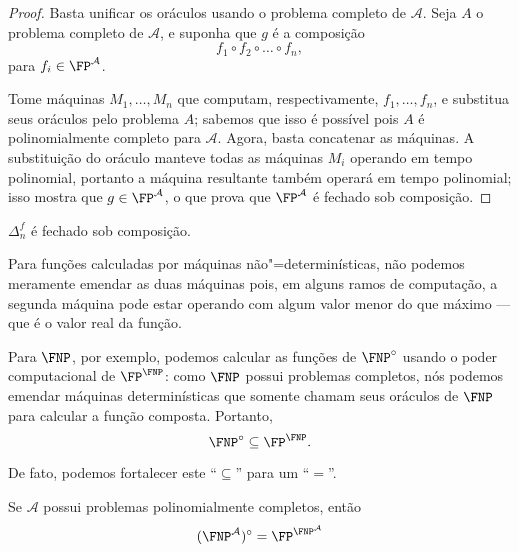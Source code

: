 \begin{proof}
    Basta unificar os oráculos usando o problema completo de $\mathcal A$.
    Seja $A$ o problema completo de $\mathcal A$,
    e suponha que $g$ é a composição
    \begin{equation*}
        f_1 \circ f_2 \circ \dots \circ f_n,
    \end{equation*}
    para $f_i \in \FP^\mathcal A$.

    Tome máquinas $M_1, \dots, M_n$ que computam,
    respectivamente, $f_1, \dots, f_n$,
    e substitua seus oráculos pelo problema $A$;
    sabemos que isso é possível pois $A$ é polinomialmente completo para $\mathcal A$.
    Agora,
    basta concatenar as máquinas.
    A substituição do oráculo manteve todas as máquinas $M_i$
    operando em tempo polinomial,
    portanto a máquina resultante também operará em tempo polinomial;
    isso mostra que $g \in \FP^\mathcal A$,
    o que prova que $\FP^\mathcal A$ é fechado sob composição.
\end{proof}

\begin{ucorollary}
    $\Delta_n^f$ é fechado sob composição.
\end{ucorollary}

Para funções calculadas por máquinas não"=determinísticas,
não podemos meramente emendar as duas máquinas
pois,
em alguns ramos de computação,
a segunda máquina pode estar operando com algum valor menor do que máximo
--- que é o valor real da função.

Para $\FNP$, por exemplo,
podemos calcular as funções de $\FNP^\circ$
usando o poder computacional de $\FP^\FNP$:
como $\FNP$ possui problemas completos,
nós podemos emendar máquinas determinísticas
que somente chamam seus oráculos de $\FNP$
para calcular a função composta.
Portanto,
\begin{equation*}
    \FNP^\circ \subseteq \FP^\FNP.
\end{equation*}

De fato,
podemos fortalecer este ``$\subseteq$'' para um ``$=$''.

\begin{theorem}
    Se $\mathcal A$ possui problemas polinomialmente completos,
    então
    \begin{equation*}
        (\FNP^\mathcal A)^\circ = \FP^{\FNP^\mathcal A}
    \end{equation*}
    \label{thm:compositive_closure}
\end{theorem}

